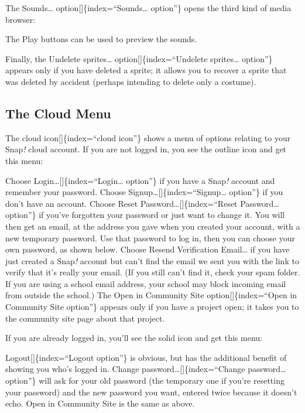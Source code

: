 \documentclass[
  letterpaper,
]{book}
\begin{document}
The Sounds\ldots{} option{[}{]}\{index=``Sounds\ldots{} option''\} opens
the third kind of media browser:

The Play buttons can be used to preview the sounds.

Finally, the Undelete sprites\ldots{} option{[}{]}\{index=``Undelete
sprites\ldots{} option''\} appears only if you have deleted a sprite; it
allows you to recover a sprite that was deleted by accident (perhaps
intending to delete only a costume).

\subsection{The Cloud Menu}\label{the-cloud-menu}

The cloud icon{[}{]}\{index=``cloud icon''\} shows a menu of options
relating to your Snap\emph{!} cloud account. If you are not logged in,
you see the outline icon and get this menu:

Choose Login\ldots{[}{]}\{index=``Login\ldots{} option''\} if you have a
Snap\emph{!} account and remember your password. Choose
Signup\ldots{[}{]}\{index=``Signup\ldots{} option''\} if you don't have
an account. Choose Reset Password\ldots{[}{]}\{index=``Reset
Password\ldots{} option''\} if you've forgotten your password or just
want to change it. You will then get an email, at the address you gave
when you created your account, with a new temporary password. Use that
password to log in, then you can choose your own password, as shown
below. Choose Resend Verification Email\ldots{} if you have just created
a Snap\emph{!} account but can't find the email we sent you with the
link to verify that it's really your email. (If you still can't find it,
check your spam folder. If you are using a school email address, your
school may block incoming email from outside the school.) The Open in
Community Site option{[}{]}\{index=``Open in Community Site option''\}
appears only if you have a project open; it takes you to the community
site page about that project.

If you are already logged in, you'll see the solid icon and get this
menu:

Logout{[}{]}\{index=``Logout option''\} is obvious, but has the
additional benefit of showing you who's logged in. Change
password\ldots{[}{]}\{index=``Change password\ldots{} option''\} will
ask for your old password (the temporary one if you're resetting your
password) and the new password you want, entered twice because it
doesn't echo. Open in Community Site is the same as above.
\end{document}
